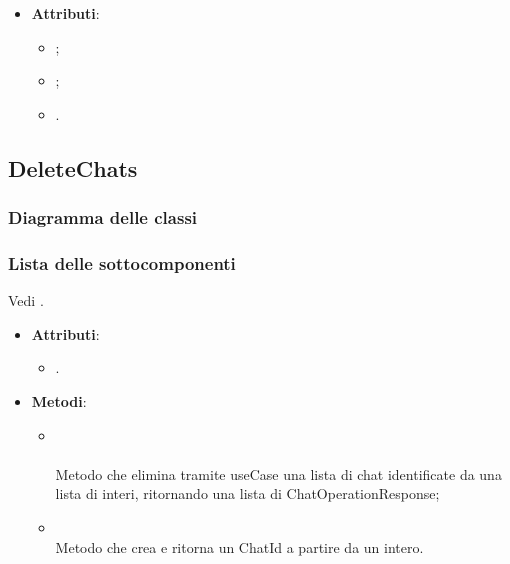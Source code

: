 \documentclass[10pt, a4paper]{article}
\begin{document}
\label{VectorStoreDocumentOperationResponseDettaglio}
\begin{itemize}
    \item \textbf{Attributi}:
    \begin{itemize}
        \item {};
        \item {};
        \item {}.
    \end{itemize}
\end{itemize}


\subsection{DeleteChats}
\subsubsection{Diagramma delle classi}
\subsubsection{Lista delle sottocomponenti}

Vedi .

\label{DeleteChatsControllerDettaglio}
\begin{itemize}
    \item \textbf{Attributi}:
    \begin{itemize}
        \item {}.
    \end{itemize}
    \item \textbf{Metodi}:
    \begin{itemize}
        \item {}\\ \\
        Metodo che elimina tramite useCase una lista di chat identificate da una lista di interi, ritornando una lista di ChatOperationResponse;
        \item {}\\
        Metodo che crea e ritorna un ChatId a partire da un intero. 
    \end{itemize}
\end{itemize}
\end{document}
